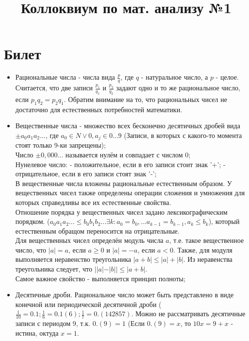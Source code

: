 \documentclass[12pt,a4paper]{article}
\title{Коллоквиум по мат. анализу №1}
\begin{document}
\maketitle
\section{Билет}
\begin{itemize}
\item Рациональные числа - числа вида $\frac{p}{q}$, где $q$ - натуральное число, а $p$ - целое. Считается, что две записи $\frac{p_1}{q_1}$ и  $\frac{p_2}{q_2}$ задают одно и то же рациональное число, если $p_1q_2=p_2q_1$. Обратим внимание на то, что рациональных чисел не достаточно для естественных потребностей математики.

\item Вещественные числа - множество всех бесконечно десятичных дробей вида $\pm a_0a_1a_2...$, где $a_0 \in N \vee {0}, a_j \in {0...9}$ (Записи, в которых с какого-то момента стоят только 9-ки запрещены); \\
Число $\pm 0,000...$ называется нулём и совпадает с числом 0;\\
Нунелевое число:
- положительное, если в его записи стоит знак '+';
- отрицательное, если в его записи стоят знак '-'; \\
В вещественные числа вложены рациональные естественным образом. У вещественных чисел также определены операции сложения и умножения для которых справедливы все их естественные свойства. \\
Отношение порядка у вещественных чисел задано лексикографическим порядком. ($a_0a_1a_2...\leq b_0b_1b_2... \exists k: a_0 = b_0, ... a_{k-1}=b_{k-1}, a_k \leq b_k$), который естественным обращом переносится на отрицательные. \\
Для вещественных чисел определён модуль числа $a$, т.е. такое вещественное число, что $|a| = a$, если $a \geq 0$ и $|a| = -a$, если $a < 0$. Также, для модуля выполняется неравенство треугольника $|a+b| \leq |a| + |b|$. Из неравенства треугольника следует, что $||a|-|b|| \leq |a+b|$. \\
Самое важное свойство - выполняется принцип полноты;

\item Десятичные дроби. Рациональное число может быть представлено в виде конечной или периодической десятичной дроби ($\frac{1}{10} = 0.1; \frac{1}{6} = 0.1(6); \frac{1}{7} = 0.(142857)$. Можно не рассматривать десятичные записи с периодом 9, т.к. $0.(9) = 1$ (Если $0.(9) = x$, то $10x=9+x$ - истина, октуда $x = 1$.


\end{itemize}
\end{document}
